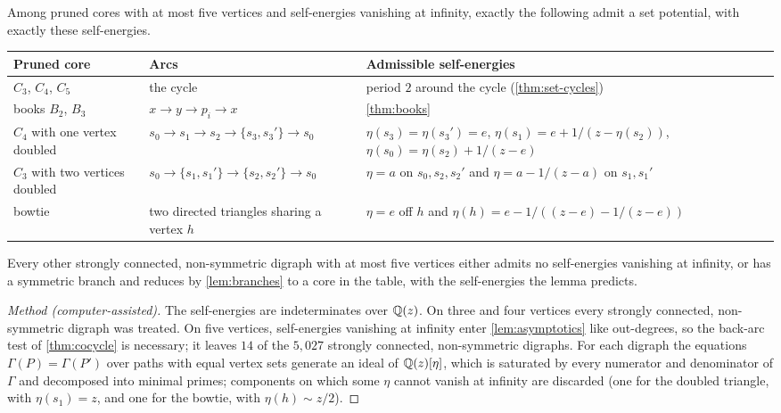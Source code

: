 \begin{theorem}\label{thm:cores5}
Among pruned cores with at most five vertices and self-energies vanishing at infinity, exactly the following admit a set potential, with exactly these self-energies.
\begin{center}\small
\begin{tabularx}{\linewidth}{@{}L{0.2}L{0.3}>{\raggedright\arraybackslash}X@{}}
\toprule
Pruned core & Arcs & Admissible self-energies\\ \midrule
$C_3$, $C_4$, $C_5$ & the cycle & period $2$ around the cycle (\cref{thm:set-cycles})\\
books $B_2$, $B_3$ & $x\to y\to p_i\to x$ & \cref{thm:books}\\
$C_4$ with one vertex doubled & $s_0\to s_1\to s_2\to\{s_3,s_3'\}\to s_0$ & $\eta(s_3)=\eta(s_3')=e$, $\eta(s_1)=e+1/(z-\eta(s_2))$, $\eta(s_0)=\eta(s_2)+1/(z-e)$\\
$C_3$ with two vertices doubled & $s_0\to\{s_1,s_1'\}\to\{s_2,s_2'\}\to s_0$ & $\eta=a$ on $s_0,s_2,s_2'$ and $\eta=a-1/(z-a)$ on $s_1,s_1'$\\
bowtie & two directed triangles sharing a vertex $h$ & $\eta=e$ off $h$ and $\eta(h)=e-1/((z-e)-1/(z-e))$\\
\bottomrule
\end{tabularx}
\end{center}
Every other strongly connected, non-symmetric digraph with at most five vertices either admits no self-energies vanishing at infinity, or has a symmetric branch and reduces by \cref{lem:branches} to a core in the table, with the self-energies the lemma predicts.
\end{theorem}
\begin{proof}[Method \textup{(computer-assisted)}]
The self-energies are indeterminates over $\mathbb{Q}(z)$. On three and four vertices every strongly connected, non-symmetric digraph was treated. On five vertices, self-energies vanishing at infinity enter \cref{lem:asymptotics} like out-degrees, so the back-arc test of \cref{thm:cocycle} is necessary; it leaves $14$ of the $5{,}027$ strongly connected, non-symmetric digraphs. For each digraph the equations $\Gamma(P)=\Gamma(P')$ over paths with equal vertex sets generate an ideal of $\mathbb{Q}(z)[\eta]$, which is saturated by every numerator and denominator of $\Gamma$ and decomposed into minimal primes; components on which some $\eta$ cannot vanish at infinity are discarded (one for the doubled triangle, with $\eta(s_1)=z$, and one for the bowtie, with $\eta(h)\sim z/2$).
\end{proof}

